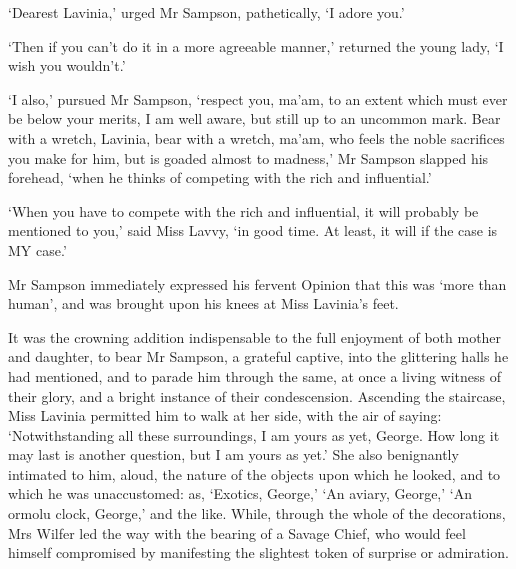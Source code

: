 ‘Dearest Lavinia,’ urged Mr Sampson, pathetically, ‘I adore you.’

‘Then if you can’t do it in a more agreeable manner,’ returned the young
lady, ‘I wish you wouldn’t.’

‘I also,’ pursued Mr Sampson, ‘respect you, ma’am, to an extent which
must ever be below your merits, I am well aware, but still up to an
uncommon mark. Bear with a wretch, Lavinia, bear with a wretch, ma’am,
who feels the noble sacrifices you make for him, but is goaded almost to
madness,’ Mr Sampson slapped his forehead, ‘when he thinks of competing
with the rich and influential.’

‘When you have to compete with the rich and influential, it will
probably be mentioned to you,’ said Miss Lavvy, ‘in good time. At least,
it will if the case is MY case.’

Mr Sampson immediately expressed his fervent Opinion that this was ‘more
than human’, and was brought upon his knees at Miss Lavinia’s feet.

It was the crowning addition indispensable to the full enjoyment of both
mother and daughter, to bear Mr Sampson, a grateful captive, into the
glittering halls he had mentioned, and to parade him through the same,
at once a living witness of their glory, and a bright instance of their
condescension. Ascending the staircase, Miss Lavinia permitted him to
walk at her side, with the air of saying: ‘Notwithstanding all these
surroundings, I am yours as yet, George. How long it may last is another
question, but I am yours as yet.’ She also benignantly intimated to him,
aloud, the nature of the objects upon which he looked, and to which he
was unaccustomed: as, ‘Exotics, George,’ ‘An aviary, George,’ ‘An
ormolu clock, George,’ and the like. While, through the whole of the
decorations, Mrs Wilfer led the way with the bearing of a Savage Chief,
who would feel himself compromised by manifesting the slightest token of
surprise or admiration.

